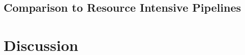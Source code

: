 \documentclass[11pt]{article}
\begin{document}
\clearpage
\subsection{Comparison to Resource Intensive Pipelines}


\section{Discussion}



\end{document}
